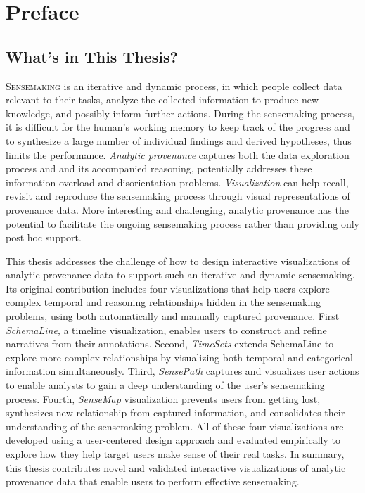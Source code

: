 \chapter*{Preface}

\section*{What's in This Thesis?}
\lettrine{S}{ensemaking} is an iterative and dynamic process, in which people collect data relevant to their tasks, analyze the collected information to produce new knowledge, and possibly inform further actions. During the sensemaking process, it is difficult for the human's working memory to keep track of the progress and to synthesize a large number of individual findings and derived hypotheses, thus limits the performance. \emph{Analytic provenance} captures both the data exploration process and and its accompanied reasoning, potentially addresses these information overload and disorientation problems. \emph{Visualization} can help recall, revisit and reproduce the sensemaking process through visual representations of provenance data. More interesting and challenging, analytic provenance has the potential to facilitate the ongoing sensemaking process rather than providing only post hoc support.

This thesis addresses the challenge of how to design interactive visualizations of analytic provenance data to support such an iterative and dynamic sensemaking. Its original contribution includes four visualizations that help users explore complex temporal and reasoning relationships hidden in the sensemaking problems, using both automatically and manually captured provenance. First \emph{SchemaLine}, a timeline visualization, enables users to construct and refine narratives from their annotations. Second, \emph{TimeSets} extends SchemaLine to explore more complex relationships by visualizing both temporal and categorical information simultaneously. Third, \emph{SensePath} captures and visualizes user actions to enable analysts to gain a deep understanding of the user's sensemaking process. Fourth, \emph{SenseMap} visualization prevents users from getting lost, synthesizes new relationship from captured information, and consolidates their understanding of the sensemaking problem. All of these four visualizations are developed using a user-centered design approach and evaluated empirically to explore how they help target users make sense of their real tasks. In summary, this thesis contributes novel and validated interactive visualizations of analytic provenance data that enable users to perform effective sensemaking.

